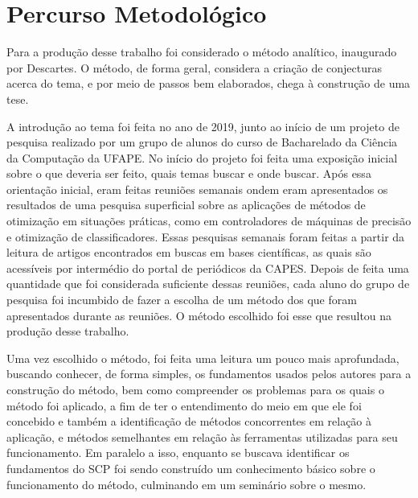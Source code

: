 \chapter{Percurso Metodológico}
\label{chap:metodologia}

\noindent
Para a produção desse trabalho foi considerado o método analítico, inaugurado por Descartes. O método, de forma geral, considera a criação de conjecturas acerca do tema, e por meio de passos bem elaborados, chega à construção de uma tese.

A introdução ao tema foi feita no ano de 2019, junto ao início de um projeto de pesquisa realizado por um grupo de alunos do curso de Bacharelado da Ciência da Computação da UFAPE. No início do projeto foi feita uma exposição inicial sobre o que deveria ser feito, quais temas buscar e onde buscar. Após essa orientação inicial, eram feitas reuniões semanais ondem eram apresentados os resultados de uma pesquisa superficial sobre as aplicações de métodos de otimização em situações práticas, como em controladores de máquinas de precisão e otimização de classificadores. Essas pesquisas semanais foram feitas a partir da leitura de artigos encontrados em buscas em bases científicas, as quais são acessíveis por intermédio do portal de periódicos da CAPES. Depois de feita uma quantidade que foi considerada suficiente dessas reuniões, cada aluno do grupo de pesquisa foi incumbido de fazer a escolha de um método dos que foram apresentados durante as reuniões. O método escolhido foi esse que resultou na produção desse trabalho.

Uma vez escolhido o método, foi feita uma leitura um pouco mais aprofundada, buscando conhecer, de forma simples, os fundamentos usados pelos autores para a construção do método, bem como compreender os problemas para os quais o método foi aplicado, a fim de ter o entendimento do meio em que ele foi concebido e também a identificação de métodos concorrentes em relação à aplicação, e métodos semelhantes em relação às ferramentas utilizadas para seu funcionamento. Em paralelo a isso, enquanto se buscava identificar os fundamentos do SCP foi sendo construído um conhecimento básico sobre o funcionamento do método, culminando em um seminário sobre o mesmo.

